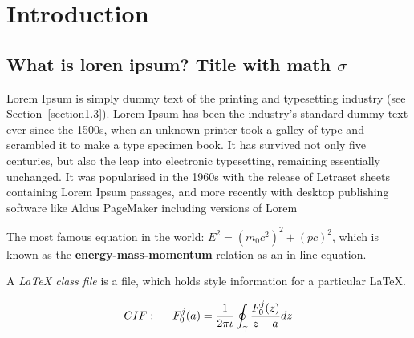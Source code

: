 
\chapter{Introduction}  %
\label{chapter1}
\ifpdf
    \graphicspath{{Chapter1/Figs/Raster/}{Chapter1/Figs/PDF/}{Chapter1/Figs/}}
\else
    \graphicspath{{Chapter1/Figs/Vector/}{Chapter1/Figs/}}
\fi


\section{What is loren ipsum? Title with math \texorpdfstring{$\sigma$}{[sigma]}} %
Lorem Ipsum is simply dummy text of the printing and typesetting industry (see 
Section~\ref{section1.3}). Lorem Ipsum  has been the industry's 
standard dummy text ever since the 1500s, when an unknown printer took a galley 
of type and scrambled it to make a type specimen book. It has survived not only 
five centuries, but also the leap into electronic typesetting, remaining 
essentially unchanged. It was popularised in the 1960s with the release of 
Letraset sheets containing Lorem Ipsum passages, and more recently with desktop 
publishing software like Aldus PageMaker including versions of Lorem 


The most famous equation in the world: $E^2 = (m_0c^2)^2 + (pc)^2$, which is 
known as the \textbf{energy-mass-momentum} relation as an in-line equation.

A {\em \LaTeX{} class file} is a file, which holds style information for a particular \LaTeX{}.


\begin{align}
CIF: \hspace*{5mm}F_0^j(a) = \frac{1}{2\pi \iota} \oint_{\gamma} \frac{F_0^j(z)}{z - a} dz
\end{align}

